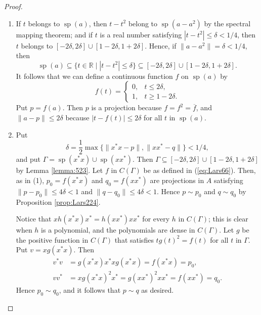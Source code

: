 \documentclass{book}
\begin{document}
\begin{proof}
  \begin{enumerate}
    \item If \(t\) belongs to \(\operatorname{sp}(a)\), then \(t-t^2\) belong to \(\operatorname{sp}(a-a^2)\)
      by the spectral mapping theorem; and if \(t\) is a real number satisfying \(|t-t^2|\leq\delta<1/4\),
      then \(t\) belongs to \([-2\delta,2\delta]\cup[1-2\delta,1+2\delta]\). Hence, if 
      \(\|a-a^2\|=\delta<1/4\), then
      \[
        \operatorname{sp}(a)\subseteq\{t\in\mathbb{R}\mid|t-t^2|\leq\delta\}\subseteq[-2\delta,2\delta]\cup[1-2\delta,1+2\delta].
      \]
      It follows that we can define a continuous function \(f\) on \(\operatorname{sp}(a)\) by
      \begin{equation}\label{eq:Lars66}
        f(t)=\begin{cases}
          0,&t\leq2\delta,\\
          1,&t\geq1-2\delta.
        \end{cases}
      \end{equation}
      Put \(p=f(a)\). Then \(p\) is a projection because \(f=f^2=\overline{f}\), and 
      \(\|a-p\|\leq2\delta\) because \(|t-f(t)|\leq2\delta\) for all \(t\) in \(\operatorname{sp}(a)\).
    \item Put
      \[
        \delta=\frac{1}{2}\max\{\|x^*x-p\|,\|xx^*-q\|\}<1/4,
      \]
      and put \(\Gamma=\operatorname{sp}(x^*x)\cup\operatorname{sp}(xx^*)\). Then 
      \(\Gamma\subseteq[-2\delta,2\delta]\cup[1-2\delta,1+2\delta]\) by
      Lemma \ref{lemma:523}. Let \(f\) in \(C(\Gamma)\) be as defined in (\ref{eq:Lars66}). Then, as in (1),
      \(p_0=f(x^*x)\) and \(q_0=f(xx^*)\) are projections in \(A\) satisfying \(\|p-p_0\|\leq4\delta<1\)
      and \(\|q-q_0\|\leq4\delta<1\). Hence \(p\sim p_0\) and \(q\sim q_0\) by Proposition \ref{prop:Lars224}.\par
      Notice that \(xh(x^*x)x^*=h(xx^*)xx^*\) for every \(h\) in \(C(\Gamma)\); this is clear
      when \(h\) is a polynomial, and the polynomials are dense in \(C(\Gamma)\).
      Let \(g\) be the positive function in \(C(\Gamma)\) that satisfies \(t g(t)^2=f(t)\)
      for all \(t\) in \(\Gamma\). Put \(v=xg(x^*x)\). Then
      \begin{align*}
        v^*v&=g(x^*x)x^*xg(x^*x)=f(x^*x)=p_0,\\
        vv^*&=xg(x^*x)^2x^*=g(xx^*)^2xx^*=f(xx^*)=q_0.
      \end{align*}
      Hence \(p_0\sim q_0\), and it follows that \(p\sim q\) as desired.
  \end{enumerate}
\end{proof}
\end{document}
